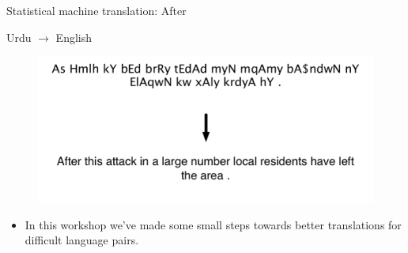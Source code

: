 \documentclass{beamer}
\begin{document}
\begin{frame}[t]{Statistical machine translation: After}
\begin{exampleblock}{Urdu $\rightarrow$ English}
  \begin{figure}
    {\centering \includegraphics[scale=0.55]{urdu-25hp.pdf}}
  \end{figure}
\end{exampleblock}
\begin{itemize}
  \item In this workshop we've made some small steps towards better translations for difficult language pairs.
\end{itemize}
\end{frame}
\end{document}
